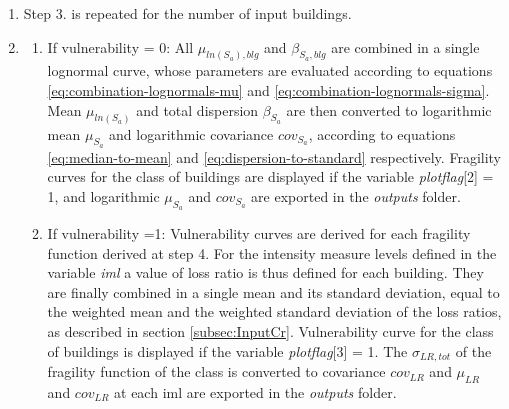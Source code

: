 \begin{enumerate}
\item Step 3. is repeated for the number of input buildings.

\item
\begin{enumerate}
\item If vulnerability = 0: All $\mu_{ln(S_a), blg}$ and $\beta_{S_a, blg}$ are combined in a single lognormal curve, whose parameters are evaluated according to equations \ref{eq:combination-lognormals-mu} and \ref{eq:combination-lognormals-sigma}. Mean $\mu_{ln(S_{a})}$ and total dispersion $\beta_{S_a}$ are then converted to logarithmic mean $\mu_{S_a}$ and logarithmic covariance $cov_{S_a}$, according to equations \ref{eq:median-to-mean} and \ref{eq:dispersion-to-standard} respectively. Fragility curves for the class of buildings are displayed if the variable \textit{plotflag}[2] = 1, and logarithmic $\mu_{S_a}$ and $cov_{S_a}$ are exported in the \textit{outputs} folder.

\item If vulnerability =1: Vulnerability curves are derived for each fragility function derived at step 4. For the intensity measure levels defined in the variable \textit{iml} a value of loss ratio is thus defined for each building. They are finally combined in a single mean and its standard deviation, equal to the weighted mean and the weighted standard deviation of the loss ratios, as described in section \ref{subsec:InputCr}. Vulnerability curve for the class of buildings is displayed if the variable \textit{plotflag}[3] = 1. The $\sigma_{LR, tot}$ of the fragility function of the class is converted to covariance $cov_{LR}$ and $\mu_{LR}$ and $cov_{LR}$ at each iml are exported in the \textit{outputs} folder.
\end{enumerate}

\end{enumerate}